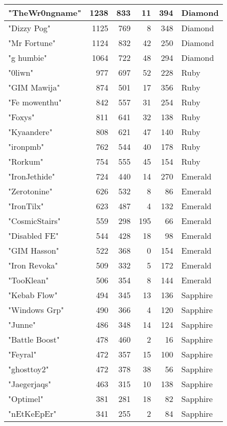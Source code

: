 \documentclass{article}
\begin{document}
\begin{table}[htbp]
\begin{tabular}{|l|r|r|r|r|l|}
"TheWr0ngname" & 1238 & 833 & 11 & 394 & Diamond \\ \hline
"Dizzy Pog" & 1125 & 769 & 8 & 348 & Diamond \\ \hline
"Mr Fortune" & 1124 & 832 & 42 & 250 & Diamond \\ \hline
"g humbie" & 1064 & 722 & 48 & 294 & Diamond \\ \hline
"0liwn" & 977 & 697 & 52 & 228 & Ruby \\ \hline
"GIM Mawija" & 874 & 501 & 17 & 356 & Ruby \\ \hline
"Fe mowenthu" & 842 & 557 & 31 & 254 & Ruby \\ \hline
"Foxys" & 811 & 641 & 32 & 138 & Ruby \\ \hline
"Kyaandere" & 808 & 621 & 47 & 140 & Ruby \\ \hline
"ironpmb" & 762 & 544 & 40 & 178 & Ruby \\ \hline
"Rorkum" & 754 & 555 & 45 & 154 & Ruby \\ \hline
"IronJethide" & 724 & 440 & 14 & 270 & Emerald \\ \hline
"Zerotonine" & 626 & 532 & 8 & 86 & Emerald \\ \hline
"IronTilx" & 623 & 487 & 4 & 132 & Emerald \\ \hline
"CosmicStairs" & 559 & 298 & 195 & 66 & Emerald \\ \hline
"Disabled FE" & 544 & 428 & 18 & 98 & Emerald \\ \hline
"GIM Hasson" & 522 & 368 & 0 & 154 & Emerald \\ \hline
"Iron Revoka" & 509 & 332 & 5 & 172 & Emerald \\ \hline
"TooKlean" & 506 & 354 & 8 & 144 & Emerald \\ \hline
"Kebab Flow" & 494 & 345 & 13 & 136 & Sapphire \\ \hline
"Windows Grp" & 490 & 366 & 4 & 120 & Sapphire \\ \hline
"Junne" & 486 & 348 & 14 & 124 & Sapphire \\ \hline
"Battle Boost" & 478 & 460 & 2 & 16 & Sapphire \\ \hline
"Feyral" & 472 & 357 & 15 & 100 & Sapphire \\ \hline
"ghosttoy2" & 472 & 378 & 38 & 56 & Sapphire \\ \hline
"Jaegerjaqs" & 463 & 315 & 10 & 138 & Sapphire \\ \hline
"Optimel" & 381 & 281 & 18 & 82 & Sapphire \\ \hline
"nEtKeEpEr" & 341 & 255 & 2 & 84 & Sapphire \\ \hline

\end{tabular}
\end{table}
\end{document}

